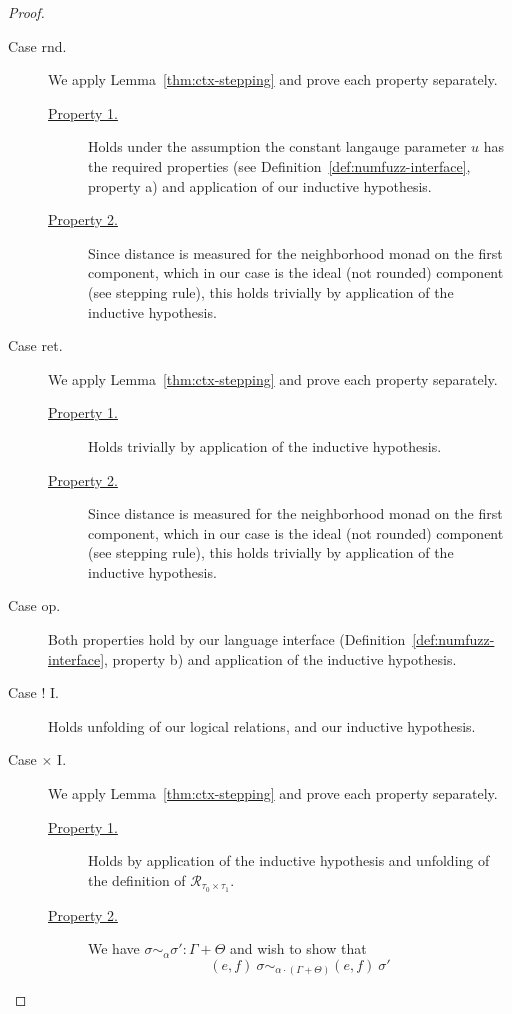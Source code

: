\begin{proof}
\begin{description}
    \item[Case rnd.] 
      We apply Lemma~\ref{thm:ctx-stepping} and prove each property separately.
      \begin{description}
        \item[\underline{Property 1.}]
          Holds under the assumption the constant langauge parameter $u$ has the
          required properties (see Definition~\ref{def:numfuzz-interface},
          property a) and application of our inductive hypothesis.
        \item[\underline{Property 2.}]
          Since distance is measured for the neighborhood monad on the first
          component, which in our case is the ideal (not rounded) component (see
          stepping rule), this holds trivially by application of the inductive
          hypothesis.
      \end{description}

    \item[Case ret.] 
      We apply Lemma~\ref{thm:ctx-stepping} and prove each property separately.
      \begin{description}
        \item[\underline{Property 1.}]
          Holds trivially by application of the inductive hypothesis.
        \item[\underline{Property 2.}]
          Since distance is measured for the neighborhood monad on the first
          component, which in our case is the ideal (not rounded) component (see
          stepping rule), this holds trivially by application of the inductive
          hypothesis.
      \end{description}

    \item[Case op.] 
      Both properties hold by our language interface
      (Definition~\ref{def:numfuzz-interface}, property b) and application of
      the inductive hypothesis.

    \item[Case ! I.] Holds unfolding of our logical relations, and our inductive
      hypothesis.

    \item[Case $\times$ I.] 
      We apply Lemma~\ref{thm:ctx-stepping} and prove each property separately.
      \begin{description}
        \item[\underline{Property 1.}]
          Holds by application of the inductive hypothesis and unfolding of the
          definition of $\mathcal{R}_{\tau_0 \times \tau_1}$.
        \item[\underline{Property 2.}]
          We have 
          $\sigma \sim_{\alpha} \sigma' : \Gamma + \Theta$ 
          and wish to show that
          $$(e, f)~\sigma \sim_{\alpha \cdot (\Gamma + \Theta)} (e, f)~\sigma'$$


\end{description}
\end{description}
\end{proof}
